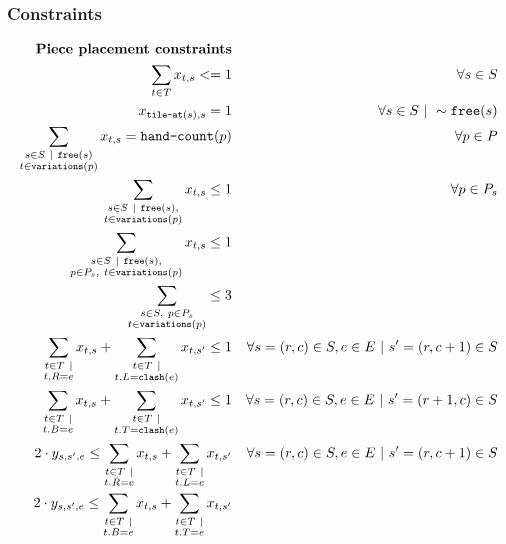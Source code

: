 \documentclass[11pt,a4paper]{article}
\begin{document}
\subsubsection*{Constraints}
\begin{align}
\textbf{Piece placement constraints} \notag \\
\label{one_tile_per_square}
\sum_{t \in T} x_{t,s} <= 1 &&
\forall s \in S \\ 
\label{default_placements}
x_{\texttt{tile-at}(s),s} = 1 &&
\forall s \in S ~|~ \sim \texttt{free}(s) \\
\label{use_pieces}
\sum_{\substack{s \in S ~|~ \texttt{free}(s) \\  t \in \texttt{variations}(p)}}x_{t,s} = \texttt{hand-count}(p) &&
\forall p \in P \\
\label{special_once}
\sum_{\substack{s \in S ~|~ \texttt{free}(s), \\ t \in \texttt{variations}(p)}} x_{t,s} \leq 1 &&
\forall p \in P_s \\
\label{one_special_per_turn}
\sum_{\substack{s \in S ~|~ \texttt{free}(s), \\ p \in P_s, ~ t \in \texttt{variations}(p)}}x_{t,s} \leq 1
\\
\label{three_specials_max}
\sum_{\substack{s \in S,~ p \in P_s \\ t \in \texttt{variations}(p)}} \leq 3
\\
\label{horizontal_clashes}
\sum_{\substack{t \in T ~| \\ t.R = e}}x_{t,s} + \sum_{\substack{t \in T ~| \\ t.L = \texttt{clash}(e)}}x_{t,s'} \leq 1 &&
\forall s = (r,c) \in S, e \in E ~|~ s' = (r,c+1) \in S \\
\label{vertical_clashes}
\sum_{\substack{t \in T ~| \\ t.B = e}}x_{t,s} + \sum_{\substack{t \in T ~| \\ t.T = \texttt{clash}(e)}}x_{t,s'} \leq 1 &&
\forall s = (r,c) \in S, e \in E ~|~ s' = (r+1,c) \in S \\
\label{horizontal_connections}
2 \cdot y_{s,s',e} \leq \sum_{\substack{t \in T ~| \\ t.R = e}} x_{t,s} + \sum_{\substack{t \in T ~| \\ t.L = e}}x_{t,s'} && 
\forall s = (r,c) \in S, e \in E ~|~  s' = (r,c+1) \in S \\
\label{vertical_connections} 
2 \cdot y_{s,s',e} \leq \sum_{\substack{t \in T ~| \\ t.B = e}} x_{t,s} + \sum_{\substack{t \in T ~| \\ t.T = e}}x_{t,s'} && 

\end{align}
\end{document}
